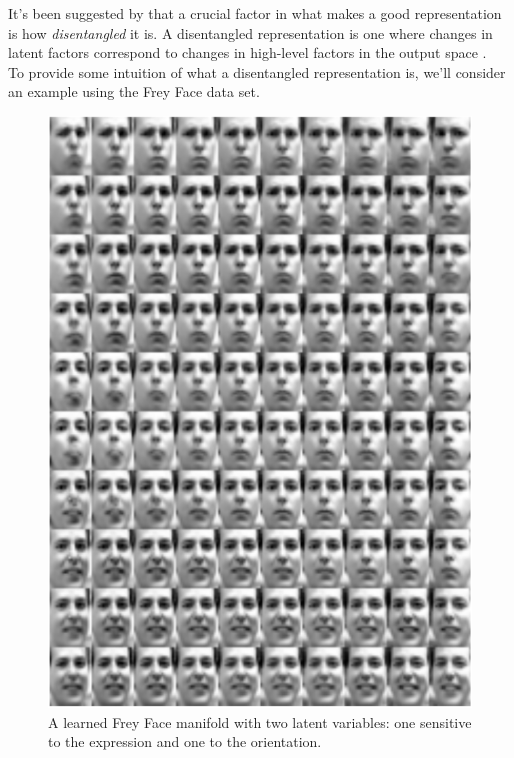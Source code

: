 \documentclass[12pt,twoside]{article}
\begin{document}
It's been suggested by \cite{Bengio2013} that a crucial factor in what makes a good representation is how \textit{disentangled} it is. A disentangled representation is one where changes in latent factors correspond to changes in high-level factors in the output space \cite{Higgins2016}.\\

To provide some intuition of what a disentangled representation is, we'll consider an example using the Frey Face data set.\\

\begin{figure}
\includegraphics[scale=0.3]{figures/kingma_2014_4a.png}
\centering
\captionsetup{justification=centering}
\caption{A learned Frey Face manifold with two latent variables: one sensitive to the expression and one to the orientation. \cite{Kingma2014}}
\label{frey_face_disentangled}
\end{figure}
\end{document}

